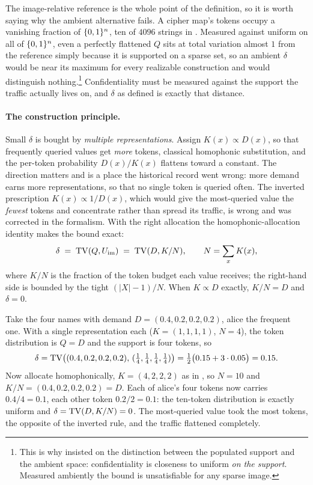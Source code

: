 The image-relative reference is the whole point of the definition, so it is
worth saying why the ambient alternative fails. A cipher map's tokens
occupy a vanishing fraction of $\{0,1\}^n$, ten of $4096$ strings in
. Measured against uniform on all of $\{0,1\}^n$, even
a perfectly flattened $Q$ sits at total variation almost $1$ from the
reference simply because it is supported on a sparse set, so an ambient
$\delta$ would be near its maximum for every realizable construction and
would distinguish nothing.\footnote{This is why 
insisted on the distinction between the populated support and the ambient
space: confidentiality is closeness to uniform \emph{on the support}.
Measured ambiently the bound is unsatisfiable for any sparse image.}
Confidentiality must be measured against the support the traffic actually
lives on, and $\delta$ as defined is exactly that distance.

\paragraph{The construction principle.}
Small $\delta$ is bought by \emph{multiple representations}. Assign
$K(x) \propto D(x)$, so that frequently queried values get \emph{more}
tokens, classical homophonic substitution, and the per-token probability
$D(x)/K(x)$ flattens toward a constant. The direction matters and is a place
the historical record went wrong: more demand earns more representations, so
that no single token is queried often. The inverted prescription
$K(x) \propto 1/D(x)$, which would give the most-queried value the
\emph{fewest} tokens and concentrate rather than spread its traffic, is
wrong and was corrected in the formalism. With the right allocation the
homophonic-allocation identity makes the bound exact:
\[
  \delta \;=\; \operatorname{TV}(Q, U_{\mathrm{im}}) \;=\; \operatorname{TV}(D, K/N),
  \qquad N = \sum_x K(x),
\]
where $K/N$ is the fraction of the token budget each value receives; the
right-hand side is bounded by the tight $(\lvert X \rvert - 1)/N$. When
$K \propto D$ exactly, $K/N = D$ and $\delta = 0$.

\begin{example}
\label{ex:delta-watchlist}
Take the four names with demand $D = (0.4, 0.2, 0.2, 0.2)$, alice the
frequent one. With a single representation each ($K = (1,1,1,1)$, $N = 4$),
the token distribution is $Q = D$ and the support is four tokens, so
\[
  \delta = \operatorname{TV}\bigl((0.4,0.2,0.2,0.2),\,(\tfrac14,\tfrac14,\tfrac14,\tfrac14)\bigr)
         = \tfrac12\bigl(0.15 + 3 \cdot 0.05\bigr) = 0.15 .
\]
Now allocate homophonically, $K = (4, 2, 2, 2)$ as in
, so $N = 10$ and $K/N = (0.4, 0.2, 0.2, 0.2) =
D$. Each of alice's four tokens now carries $0.4/4 = 0.1$, each other token
$0.2/2 = 0.1$: the ten-token distribution is exactly uniform and
$\delta = \operatorname{TV}(D, K/N) = 0$. The most-queried value took the most tokens,
the opposite of the inverted rule, and the traffic flattened completely.
\end{example}

